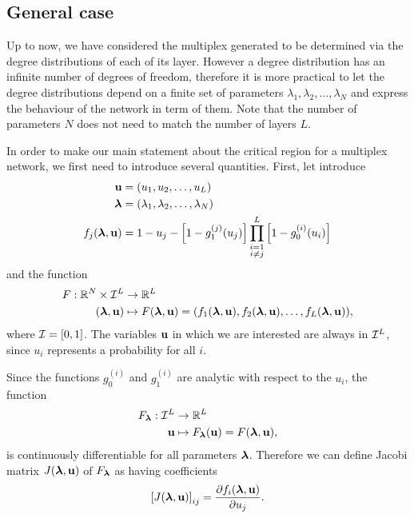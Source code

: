 \documentclass[
11pt, %
english, %
singlespacing, %
liststotoc, %
headsepline, %
]{MastersDoctoralThesis} %
\begin{document}

\subsection{General case}

Up to now, we have considered the multiplex generated to be determined via the degree distributions of each of its layer. However a degree distribution has an infinite number of degrees of freedom, therefore it is more practical to let the degree distributions depend on a finite set of parameters $\lambda_1, \lambda_2, \dots, \lambda_N$ and express the behaviour of the network in term of them. Note that the number of parameters $N$ does not need to match the number of layers $L$.

In order to make our main statement about the critical region for a multiplex network, we first need to introduce several quantities. First, let introduce
\begin{align}
	\boldsymbol{\mathrm{u}} &= (u_1, u_2, \dots, u_L) \\
	\boldsymbol{\mathrm{\lambda}} &= (\lambda_1, \lambda_2, \dots, \lambda_N) \\
	f_j(\boldsymbol{\mathrm{\lambda}}, \boldsymbol{\mathrm{u}}) &= 1 - u_j - \left[1 - g_1^{(j)}(u_j) \right] \prod_{\substack{i = 1 \\ i \neq j}}^{L}  \left[1 - g_0^{(i)}(u_i) \right] \label{Definition fj}
\end{align}
and the function
\begin{align}
	F : \mathbb{R}^N \times \mathcal{I}^L &\rightarrow \mathbb{R}^L \\
	(\boldsymbol{\mathrm{\lambda}}, \boldsymbol{\mathrm{u}}) &\mapsto F(\boldsymbol{\mathrm{\lambda}}, \boldsymbol{\mathrm{u}}) = (f_1(\boldsymbol{\mathrm{\lambda}}, \boldsymbol{\mathrm{u}}), f_2(\boldsymbol{\mathrm{\lambda}}, \boldsymbol{\mathrm{u}}), \dots, f_L(\boldsymbol{\mathrm{\lambda}}, \boldsymbol{\mathrm{u}})), \label{Definition F}
\end{align}
where $\mathcal{I} = [0, 1]$. The variables $\boldsymbol{\mathrm{u}}$ in which we are interested are always in $\mathcal{I}^L$, since $u_i$ represents a probability for all $i$.

Since the functions $g_0^{(i)}$ and $g_1^{(i)}$ are analytic with respect to the $u_i$, the function
\begin{align}
	F_{\boldsymbol{\mathrm{\lambda}}} : \mathcal{I}^L &\rightarrow \mathbb{R}^L\\
		\boldsymbol{\mathrm{u}} &\mapsto F_{\boldsymbol{\mathrm{\lambda}}}(\boldsymbol{\mathrm{u}}) = F(\boldsymbol{\mathrm{\lambda}}, \boldsymbol{\mathrm{u}}),
\end{align}
is continuously differentiable for all parameters $\boldsymbol{\mathrm{\lambda}}$. Therefore we can define Jacobi matrix $J(\boldsymbol{\mathrm{\lambda}}, \boldsymbol{\mathrm{u}})$ of $F_{\boldsymbol{\mathrm{\lambda}}}$ as having coefficients
\begin{align}
	\left[ J(\boldsymbol{\mathrm{\lambda}}, \boldsymbol{\mathrm{u}}) \right]_{ij} = \frac{\partial f_i(\boldsymbol{\mathrm{\lambda}},\boldsymbol{\mathrm{u}})}{\partial u_j}.
\end{align}
\end{document}
